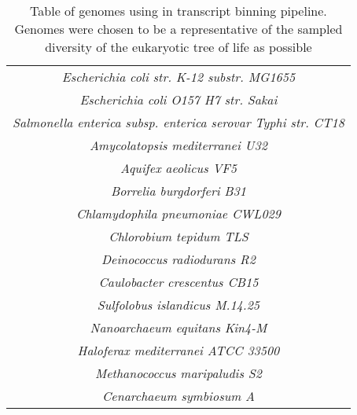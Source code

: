 \begin{table}
\begin{tabular}{|c|}
		\textit{Escherichia coli str. K-12 substr. MG1655}\\
		\textit{Escherichia coli O157 H7 str. Sakai}\\
		\textit{Salmonella enterica subsp. enterica serovar Typhi str. CT18}\\
		\textit{Amycolatopsis mediterranei U32}\\
		\textit{Aquifex aeolicus VF5}\\
		\textit{Borrelia burgdorferi B31}\\
		\textit{Chlamydophila pneumoniae CWL029}\\
		\textit{Chlorobium tepidum TLS}\\
		\textit{Deinococcus radiodurans R2}\\
		\textit{Caulobacter crescentus CB15}\\
		\textit{Sulfolobus islandicus M.14.25}\\
		\textit{Nanoarchaeum equitans Kin4-M}\\
		\textit{Haloferax mediterranei ATCC 33500}\\
		\textit{Methanococcus maripaludis S2}\\
		\textit{Cenarchaeum symbiosum A}\\
	\hline
	\end{tabular}
	\caption{Table of genomes using in transcript binning pipeline.
		Genomes were chosen to be a representative of the sampled diversity of the 
		eukaryotic tree of life as possible}
	\label{tab:appen_genomes}
\end{table}

